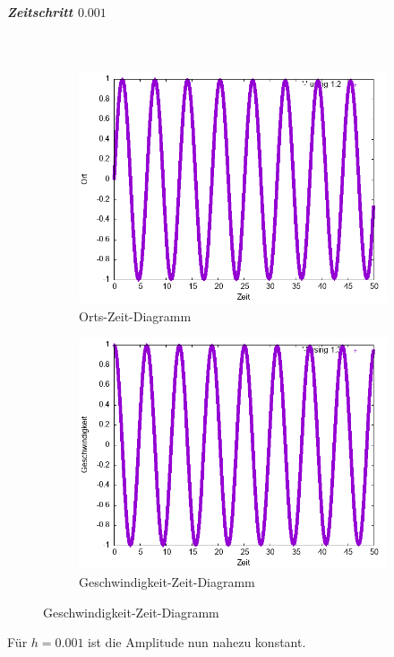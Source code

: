 \documentclass[
    oneside,
    ngerman,
    footinclude=false,
    captions=tableheading,
    DIV=12
]{scrartcl}
\begin{document}
            \subparagraph*{Zeitschritt $0.001$}\,
            \begin{figure}[H]
                \centering
                \begin{subfigure}[b]{0.45\textwidth}
                    \centering
                    \includegraphics[width=\textwidth]{Bilddateien/LLA1(a)-0001-0-x.png}
                    \caption{Orts-Zeit-Diagramm}
                    \label{fig:LLA1(a)-0001-0-x}
                \end{subfigure}
                \hfill
                \begin{subfigure}[b]{0.45\textwidth}
                    \centering
                    \includegraphics[width=\textwidth]{Bilddateien/LLA1(a)-0001-0-v.png}
                    \caption{Geschwindigkeit-Zeit-Diagramm}
                    \label{fig:LLA1(a)-0001-0-v}
                \end{subfigure}
            \end{figure}
            Für $h=0.001$ ist die Amplitude nun nahezu konstant.
            
\end{document}
